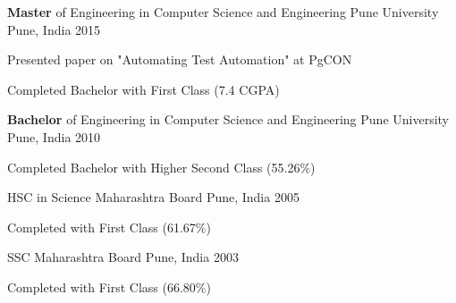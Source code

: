 

\begin{cventries}

  \cventry
    {\textbf{Master} of Engineering in Computer Science and Engineering} %
    {Pune University} %
    {Pune, India} %
    {2015} %
    {
      \begin{cvitems} %
        \item {Presented paper on "Automating Test Automation" at PgCON}
		\item {Completed Bachelor with First Class (7.4 CGPA)}
      \end{cvitems}
    }
	\cventry
    {\textbf{Bachelor} of Engineering in Computer Science and Engineering} %
    {Pune University} %
    {Pune, India} %
    {2010} %
    {
      \begin{cvitems} %
        \item {Completed Bachelor with Higher Second Class (55.26\%)}
      \end{cvitems}
    }
	\cventry
    {HSC in Science} %
    {Maharashtra Board} %
    {Pune, India} %
    {2005} %
    {
      \begin{cvitems} %
        \item {Completed with First Class (61.67\%)}
      \end{cvitems}
    }
	\cventry
    {SSC} %
    {Maharashtra Board} %
    {Pune, India} %
    {2003} %
    {
      \begin{cvitems} %
        \item {Completed with First Class (66.80\%)}
      \end{cvitems}
    }
\end{cventries}
